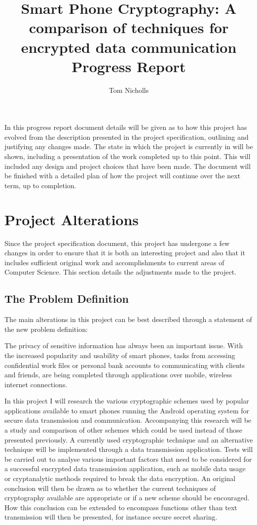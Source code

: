 \documentclass[a4paper,11pt]{article}
\title{Smart Phone Cryptography: A comparison of techniques for encrypted data communication \\ Progress Report}
\author{Tom Nicholls}
\begin{document}
\maketitle

In this progress report document details will be given as to how this project has evolved from the description presented in the project specification, outlining and justifying any changes made. The state in which the project is currently in will be shown, including a presentation of the work completed up to this point. This will included any design and project choices that have been made. The document will be finished with a detailed plan of how the project will continue over the next term, up to completion. 

\section{Project Alterations}

Since the project specification document, this project has undergone a few changes in order to ensure that it is both an interesting project and also that it includes sufficient original work and accomplishments to current areas of Computer Science. This section details the adjustments made to the project.

\subsection{The Problem Definition}  

The main alterations in this project can be best described through a statement of the new problem definition:

The privacy of sensitive information has always been an important issue. With the increased popularity and usability of smart phones, tasks from accessing confidential work files or personal bank accounts to communicating with clients and friends, are being completed through applications over mobile, wireless internet connections. 

In this project I will research the various cryptographic schemes used by popular applications available to smart phones running the Android operating system for secure data transmission and communication. Accompanying this research will be a study and comparison of other schemes which could be used instead of those presented previously. A currently used cryptographic technique and an alternative technique will be implemented through a data transmission application. Tests will be carried out to analyse various important factors that need to be considered for a successful encrypted data transmission application, such as mobile data usage or cryptanalytic methods required to break the data encryption. An original conclusion will then be drawn as to whether the current techniques of cryptography available are appropriate or if a new scheme should be encouraged. How this conclusion can be extended to encompass functions other than text transmission will then be presented, for instance secure secret sharing.
\end{document}
